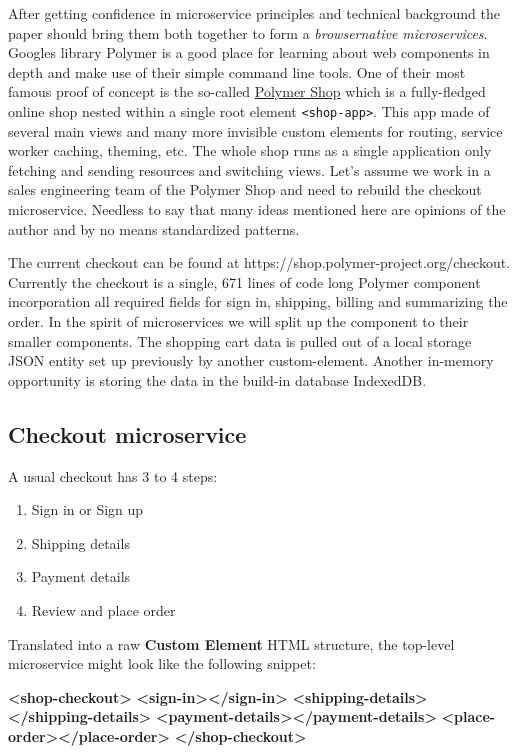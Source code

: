 \documentclass[]{article}
\newenvironment{Shaded}{}{}
\newcommand{\KeywordTok}[1]{\textcolor[rgb]{0.00,0.44,0.13}{\textbf{{#1}}}}
\providecommand{\tightlist}{%
  \setlength{\itemsep}{0pt}\setlength{\parskip}{0pt}}
\begin{document}
After getting confidence in microservice principles and technical
background the paper should bring them both together to form a
\emph{browsernative microservices}. Googles library Polymer is a good
place for learning about web components in depth and make use of their
simple command line tools. One of their most famous proof of concept is
the so-called \href{https://shop.polymer-project.org/}{Polymer Shop}
which is a fully-fledged online shop nested within a single root element
\texttt{\textless{}shop-app\textgreater{}}. This app made of several
main views and many more invisible custom elements for routing, service
worker caching, theming, etc. The whole shop runs as a single
application only fetching and sending resources and switching views.
Let's assume we work in a sales engineering team of the Polymer Shop and
need to rebuild the checkout microservice. Needless to say that many
ideas mentioned here are opinions of the author and by no means
standardized patterns.

The current checkout can be found at
https://shop.polymer-project.org/checkout. Currently the checkout is a
single, 671 lines of code long Polymer component incorporation all
required fields for sign in, shipping, billing and summarizing the
order. In the spirit of microservices we will split up the component to
their smaller components. The shopping cart data is pulled out of a
local storage JSON entity set up previously by another custom-element.
Another in-memory opportunity is storing the data in the build-in
database IndexedDB.

\subsection{Checkout microservice}\label{checkout-microservice}

A usual checkout has 3 to 4 steps:

\begin{enumerate}
\def\labelenumi{\arabic{enumi}.}
\tightlist
\item
  Sign in or Sign up
\item
  Shipping details
\item
  Payment details
\item
  Review and place order
\end{enumerate}

Translated into a raw \textbf{Custom Element} HTML structure, the
top-level microservice might look like the following snippet:

\begin{Shaded}
\begin{Highlighting}[]
\KeywordTok{<shop-checkout>}
  \KeywordTok{<sign-in></sign-in>}
  \KeywordTok{<shipping-details></shipping-details>}
  \KeywordTok{<payment-details></payment-details>}
  \KeywordTok{<place-order></place-order>}
\KeywordTok{</shop-checkout>}
\end{Highlighting}
\end{Shaded}
\end{document}
